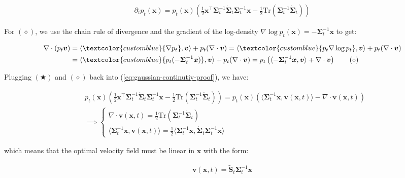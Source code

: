 \documentclass{article}
\newcommand{\bluetext}[1]{\textcolor{customblue}{#1}}
\begin{document}
\begin{small}
\begin{align}
    \partial_t p_t(\boldsymbol{x})= p_t(\boldsymbol{x}) \left(\frac{1}{2}\boldsymbol{x}^\top\boldsymbol{\Sigma}^{-1}_t\dot{\boldsymbol{\Sigma}}_t\boldsymbol{\Sigma}_t^{-1}\boldsymbol{x}-\frac{1}{2}\text{Tr}(\boldsymbol{\Sigma}_t^{-1}\dot{\boldsymbol{\Sigma}}_t)\right)\tag{$\bigstar$}
\end{align}
\end{small}
For $(\diamond)$, we use the chain rule of divergence and the gradient of the log-density $\nabla \log p_t(\boldsymbol{x})=-\boldsymbol{\Sigma}_t^{-1}\boldsymbol{x}$ to get:
\begin{small}
\begin{align}
    \nabla \cdot(p_t\boldsymbol{v})&=\langle \bluetext{\nabla p_t}, \boldsymbol{v}\rangle+p_t(\nabla \cdot \boldsymbol{v})=\langle \bluetext{p_t\nabla \log p_t}, \boldsymbol{v}\rangle+p_t(\nabla \cdot \boldsymbol{v})\nonumber\\
    &=\langle \bluetext{p_t(-\boldsymbol{\Sigma}_t^{-1}\boldsymbol{x})}, \boldsymbol{v}\rangle+p_t(\nabla \cdot \boldsymbol{v})=p_t\left(\langle -\boldsymbol{\Sigma}_t^{-1}\boldsymbol{x}, \boldsymbol{v}\rangle+\nabla \cdot \boldsymbol{v}\right)\tag{$\diamond$}
\end{align}
\end{small}
Plugging $(\bigstar)$ and $(\diamond)$ back into (\ref{eq:gaussian-continutiy-proof}), we have: 
\begin{small}
\begin{align}
    &p_t(\boldsymbol{x}) \left(\frac{1}{2}\boldsymbol{x}^\top\boldsymbol{\Sigma}^{-1}_t\dot{\boldsymbol{\Sigma}}_t\boldsymbol{\Sigma}_t^{-1}\boldsymbol{x}-\frac{1}{2}\text{Tr}(\boldsymbol{\Sigma}_t^{-1}\dot{\boldsymbol{\Sigma}}_t)\right)=p_t(\boldsymbol{x})\left(\langle \boldsymbol{\Sigma}_t^{-1}\boldsymbol{x}, \boldsymbol{v}(\boldsymbol{x},t)\rangle-\nabla \cdot \boldsymbol{v}(\boldsymbol{x},t)\right)\nonumber\\
    &\implies \begin{cases}
        \nabla \cdot \boldsymbol{v}(\boldsymbol{x},t)=\frac{1}{2}\text{Tr}(\boldsymbol{\Sigma}_t^{-1}\dot{\boldsymbol{\Sigma}}_t)\\
        \langle \boldsymbol{\Sigma}_t^{-1}\boldsymbol{x}, \boldsymbol{v}(\boldsymbol{x},t)\rangle=\frac{1}{2}\langle \boldsymbol{\Sigma}^{-1}_t\boldsymbol{x}, \dot{\boldsymbol{\Sigma}}_t\boldsymbol{\Sigma}_t^{-1}\boldsymbol{x}\rangle
    \end{cases}
\end{align}
\end{small}
which means that the optimal velocity field must be linear in $\boldsymbol{x}$ with the form:
\begin{small}
\begin{align}
    \boldsymbol{v}(\boldsymbol{x},t)=\tilde{\boldsymbol{S}}_t\boldsymbol{\Sigma}^{-1}_t\boldsymbol{x}\label{eq:gaussian-proof-velocity-field}
\end{align}
\end{small}
\end{document}

